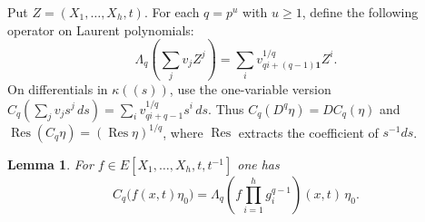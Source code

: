 \documentclass[11pt,letterpaper]{article}
\newtheorem{lemma}[theorem]{Lemma}
\theoremstyle{definition}
\numberwithin{equation}{section}
\DeclareMathOperator{\Res}{Res}
\begin{document}
Put $Z=(X_1,\ldots,X_h,t)$. For each $q=p^u$ with $u\ge 1$, define the following operator on
Laurent polynomials:
\[
  \Lambda_q\left(\sum_j v_j Z^j\right) = \sum_i v_{qi+(q-1)\mathbf{1}}^{1/q} Z^i.
\]
On differentials in $\kappa((s))$, use the one-variable version
$C_q(\sum_j v_j s^j\,ds)=\sum_i v_{qi+q-1}^{1/q}s^i\,ds$.
Thus $C_q(D^q \eta)=DC_q(\eta)$ and $\Res(C_q \eta)=(\Res\eta)^{1/q}$, where $\Res$ extracts the coefficient of
$s^{-1}ds$.

\begin{lemma}\label{thm:cartier}
For $f\in E[X_1,\ldots,X_h,t,t^{-1}]$ one has
\begin{equation}\label{eq:cartier}
  C_q\bigl(f(x,t)\eta_0\bigr) = \Lambda_q\left(f\prod_{i=1}^h g_i^{q-1}\right)(x,t)\,\eta_0.
\end{equation}
\end{lemma}
\end{document}
